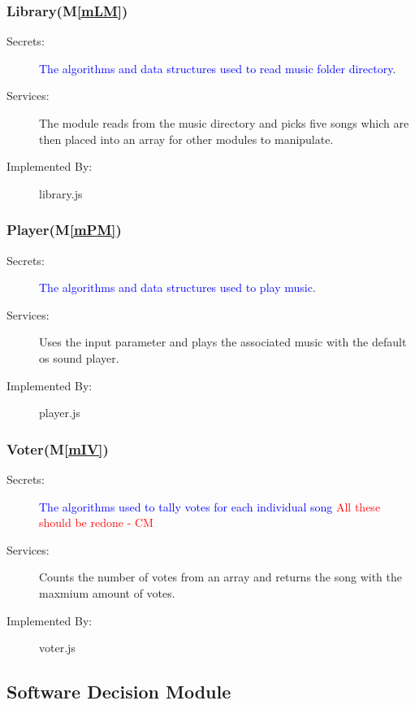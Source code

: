 \documentclass[12pt, titlepage]{article}
\newcommand{\mref}[1]{M\ref{#1}}
\begin{document}
\subsubsection{Library(\mref{mLM})}
\begin{description}
\item[Secrets:] \textcolor{blue}{The algorithms and data structures used to read music folder directory}. \item[Services:]The module reads from the music directory and picks five songs which are then placed into an array for other modules to manipulate. \item[Implemented By:] library.js
\end{description}

\subsubsection{Player(\mref{mPM})}


\begin{description}
\item[Secrets:] \textcolor{blue}{The algorithms and data structures used to play music}.
\item[Services:]Uses the input parameter and plays the associated music with the default os sound player.
\item[Implemented By:]player.js
\end{description}



\subsubsection{Voter(\mref{mIV})}


\begin{description}
\item[Secrets:]\textcolor{blue}{The algorithms used to tally votes for each individual song} \textcolor{red}{All these should be redone - CM} \\
\item[Services:]Counts the number of votes from an array and returns the song with the maxmium amount of votes.
\item[Implemented By:] voter.js
\end{description}










\subsection{Software Decision Module}
\end{document}
